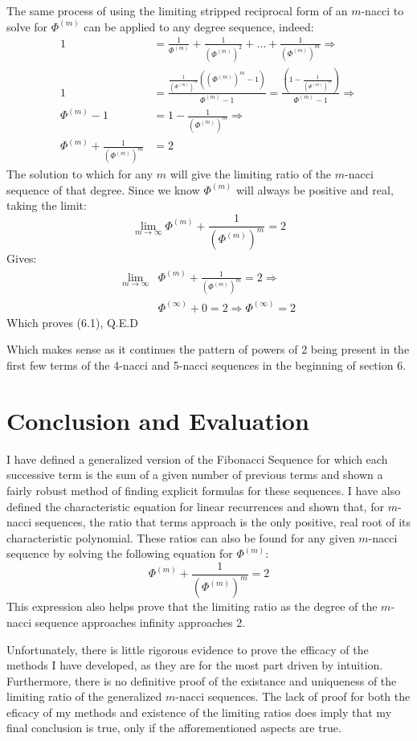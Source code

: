 \documentclass[11pt]{article}
\begin{document}
The same process of using the limiting stripped reciprocal form of an \(m\)-nacci to solve for \(\Phi^{(m)}\) can be applied to any degree sequence, indeed:
\begin{align*}
    1&=\frac{1}{\Phi^{(m)}}+\frac{1}{(\Phi^{(m)})^2}+\dots+\frac{1}{(\Phi^{(m)})^m} \Rightarrow \\
    1&=\frac{\frac{1}{(\Phi^{(m)})^m}((\Phi^{(m)})^m-1)}{\Phi^{(m)}-1}=\frac{(1-\frac{1}{(\Phi^{(m)})^m})}{\Phi^{(m)}-1} \Rightarrow \\
    \Phi^{(m)}-1&=1-\frac{1}{(\Phi^{(m)})^m} \Rightarrow \\
    \Phi^{(m)}+\frac{1}{(\Phi^{(m)})^m}&=2
\end{align*}
The solution to which for any \(m\) will give the limiting ratio of the \(m\)-nacci sequence of that degree.
Since we know \(\Phi^{(m)}\) will always be positive and real, taking the limit:
\[\lim_{m\to\infty}\Phi^{(m)}+\frac{1}{(\Phi^{(m)})^m}=2\]
Gives:
\begin{align*}
    \lim_{m\to\infty}&\Phi^{(m)}+\frac{1}{(\Phi^{(m)})^m}=2 \Rightarrow \\
    &\Phi^{(\infty)}+0=2 \Rightarrow \Phi^{(\infty)}=2
\end{align*}
Which proves (6.1), Q.E.D

Which makes sense as it continues the pattern of powers of 2 being present in the first few terms of the 4-nacci and 5-nacci sequences in the beginning of section 6. 


\section{Conclusion and Evaluation}
I have defined a generalized version of the Fibonacci Sequence for which each successive term is the sum of a given number of previous terms and shown a fairly robust method of finding explicit formulas for these sequences. I have also defined the characteristic equation for linear recurrences and shown that, for \(m\)-nacci sequences, the ratio that terms approach is the only positive, real root of its characteristic polynomial. 
These ratios can also be found for any given \(m\)-nacci sequence by solving the following equation for \(\Phi^{(m)}\):
\[\Phi^{(m)}+\frac{1}{(\Phi^{(m)})^m}=2\]
This expression also helps prove that the limiting ratio as the degree of the \(m\)-nacci sequence approaches infinity approaches 2.

Unfortunately, there is little rigorous evidence to prove the efficacy of the methods I have developed, as they are for the most part driven by intuition. Furthermore, there is no definitive proof of the existance and uniqueness of the limiting ratio of the generalized \(m\)-nacci sequences. The lack of proof for both the eficacy of my methods and existence of the limiting ratios does imply that my final conclusion is true, only if the afforementioned aspects are true. 
\end{document}
